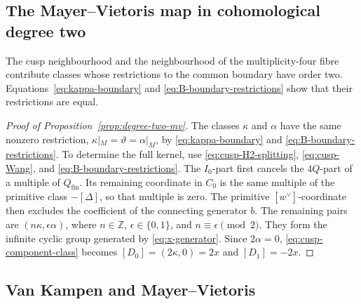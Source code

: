 \subsection{The Mayer--Vietoris map in cohomological degree two}

The cusp neighbourhood and the neighbourhood of the multiplicity-four fibre
contribute classes whose restrictions to the common boundary have order two.
Equations~\eqref{eq:kappa-boundary}
and \eqref{eq:B-boundary-restrictions} show that their restrictions are equal.

\begin{proof}[Proof of Proposition~\ref{prop:degree-two-mv}]
The classes $\kappa$ and $\alpha$ have the same nonzero restriction,
$\kappa|_M=\vartheta=\alpha|_M$,
by \eqref{eq:kappa-boundary} and
\eqref{eq:B-boundary-restrictions}.  To determine the full kernel, use
\eqref{eq:cusp-H2-splitting}, \eqref{eq:cusp-Wang}, and
\eqref{eq:B-boundary-restrictions}.  The $I_0$-part first cancels the
$4Q$-part of a multiple of $Q_{\mathrm{fin}}$.  Its remaining coordinate in
$C_0$ is the same multiple of the primitive class $-[\Delta]$, so
that multiple is zero.  The primitive $[w^\vee]$-coordinate then excludes the
coefficient of the connecting generator $b$.  The remaining pairs are
$(n\kappa,\epsilon\alpha)$, where $n\in\mathbb Z$,
$\epsilon\in\{0,1\}$, and $n\equiv\epsilon\pmod2$.
They form the infinite cyclic group generated by
\eqref{eq:x-generator}.  Since $2\alpha=0$,
\eqref{eq:cusp-component-class} becomes
$[D_0]=(2\kappa,0)=2x$ and $[D_1]=-2x$.
\end{proof}

\subsection{Van Kampen and Mayer--Vietoris}


